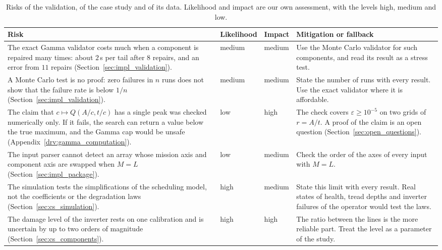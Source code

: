 \documentclass[11pt,a4paper]{article}
\theoremstyle{plain}
\theoremstyle{definition}
\theoremstyle{remark}
\begin{document}
\begin{table}[htbp]
\centering
\caption{Risks of the validation, of the case study and of its data.
Likelihood and impact are our own assessment, with the levels high, medium and low.}
\label{tab:risks_case}
\small
\begin{tabularx}{\linewidth}{@{}>{\hsize=1.479\hsize\raggedright\arraybackslash}X>{\hsize=0.521\hsize\raggedright\arraybackslash}X>{\hsize=0.356\hsize\raggedright\arraybackslash}X>{\hsize=1.644\hsize\raggedright\arraybackslash}X@{}}
\toprule
\rowcolor{headgrey}
\textbf{Risk} & \textbf{Likelihood} & \textbf{Impact} & \textbf{Mitigation or fallback} \\
\midrule
The exact Gamma validator costs much when a component is repaired many times: about $2$\,s per tail after $8$ repairs, and an error from $11$ repairs (Section~\ref{sec:impl_validation}).
  & medium & medium
  & Use the Monte Carlo validator for such components, and read its result as a stress test. \\
A Monte Carlo test is no proof: zero failures in $n$ runs does not show that the failure rate is below $1/n$ (Section~\ref{sec:impl_validation}).
  & medium & medium
  & State the number of runs with every result. Use the exact validator where it is affordable. \\
The claim that $c \mapsto Q(A/c, t/c)$ has a single peak was checked numerically only. If it fails, the search can return a value below the true maximum, and the Gamma cap would be unsafe (Appendix~\ref{drv:gamma_computation}).
  & low & high
  & The check covers $\varepsilon \ge 10^{-5}$ on two grids of $r = A/t$. A proof of the claim is an open question (Section~\ref{sec:open_questions}). \\
The input parser cannot detect an array whose mission axis and component axis are swapped when $M = L$ (Section~\ref{sec:impl_package}).
  & low & medium
  & Check the order of the axes of every input with $M = L$. \\
The simulation tests the simplifications of the scheduling model, not the coefficients or the degradation laws (Section~\ref{sec:cs_simulation}).
  & high & medium
  & State this limit with every result. Real states of health, tread depths and inverter failures of the operator would test the laws. \\
The damage level of the inverter rests on one calibration and is uncertain by up to two orders of magnitude (Section~\ref{sec:cs_components}).
  & high & high
  & The ratio between the lines is the more reliable part. Treat the level as a parameter of the study. \\

\end{tabularx}
\end{table}
\end{document}
